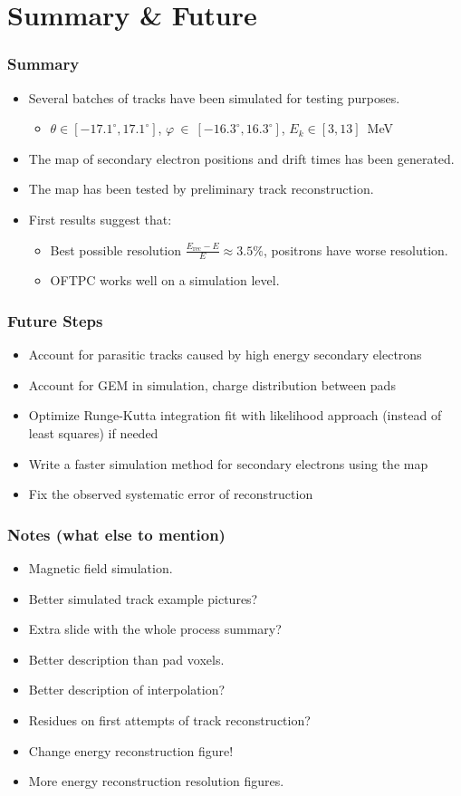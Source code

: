 \documentclass{beamer}
\begin{document}
	
	\section{Summary \& Future}	
	\begin{frame}
		\frametitle{Summary}
		\begin{itemize}
			\item Several batches of tracks have been simulated for testing purposes.
			\begin{itemize}
				\item $\theta\in[-17.1^\circ,17.1^\circ]$, $\varphi~\in~[-16.3^\circ,16.3^\circ]$, $ E_k \in [3,13] $~MeV
			\end{itemize}
			\item The map of secondary electron positions and drift times has been generated.
			\item The map has been tested by preliminary track reconstruction.
			\item First results suggest that:
			\begin{itemize}
				\item Best possible resolution $\frac{E_\text{rec}-E}{E} \approx 3.5\%$, positrons have worse resolution.
				\item OFTPC works well on a simulation level.
			\end{itemize}
		\end{itemize}
	\end{frame}
	\begin{frame}
		\frametitle{Future Steps}
		\begin{itemize}
			\item Account for parasitic tracks caused by high energy secondary electrons
			\item Account for GEM in simulation, charge distribution between pads
			\item Optimize Runge-Kutta integration fit with likelihood approach (instead of least squares) if needed
			\item Write a faster simulation method for secondary electrons using the map
			\item Fix the observed systematic error of reconstruction
		\end{itemize}
	\end{frame}
	\begin{frame}
		\frametitle{Notes (what else to mention)}
		\begin{itemize}
			\item Magnetic field simulation.
			\item Better simulated track example pictures?
			\item Extra slide with the whole process summary?
			\item Better description than pad voxels.
			\item Better description of interpolation?
			\item Residues on first attempts of track reconstruction?
			\item Change energy reconstruction figure!
			\item More energy reconstruction resolution figures.
		\end{itemize}
	\end{frame}
	
\end{document}
